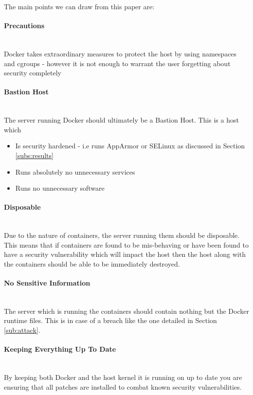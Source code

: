 \documentclass{article}
\begin{document}
The main points we can draw from this paper are:
\paragraph{Precautions}\mbox{}\\
Docker takes extraordinary measures to protect the host by using namespaces and cgroups - however it is not enough to warrant the user forgetting about security completely

\paragraph{Bastion Host}\mbox{}\\
The server running Docker should ultimately be a Bastion Host. This is a host which 
\begin{itemize}
  \item Is security hardened - i.e runs AppArmor or SELinux as discussed in Section \ref{subs:results}
  \item Runs absolutely no unnecessary services
  \item Runs no unnecessary software
\end{itemize}

\paragraph{Disposable}\mbox{}\\
Due to the nature of containers, the server running them should be disposable. This means that if containers are found to be mis-behaving or have been found to have a security vulnerability which will impact the host then the host along with the containers should be able to be immediately destroyed.

\paragraph{No Sensitive Information}\mbox{}\\
The server which is running the containers should contain nothing but the Docker runtime files. This is in case of a breach like the one detailed in Section \ref{sub:attack}.

\paragraph{Keeping Everything Up To Date}\mbox{}\\
By keeping both Docker and the host kernel it is running on up to date you are ensuring that all patches are installed to combat known security vulnerabilities.
\end{document}
